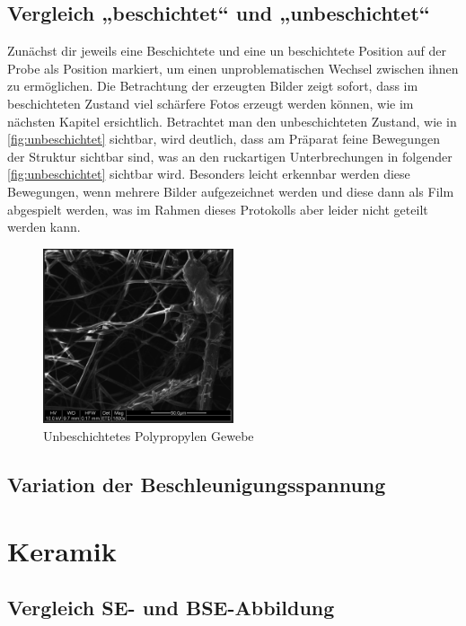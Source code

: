 \documentclass[12pt,english,ngerman]{scrartcl}
\begin{document}
\subsection{Vergleich „beschichtet“ und „unbeschichtet“}

Zunächst dir jeweils eine Beschichtete und eine un beschichtete Position auf der Probe als Position markiert, um einen
unproblematischen Wechsel zwischen ihnen zu ermöglichen. Die Betrachtung der erzeugten Bilder zeigt sofort, dass im 
beschichteten Zustand viel schärfere Fotos erzeugt werden können, wie im nächsten Kapitel ersichtlich. Betrachtet man 
den unbeschichteten Zustand, wie in \autoref{fig:unbeschichtet} sichtbar, wird deutlich, dass am Präparat feine 
Bewegungen der Struktur sichtbar sind, was an den ruckartigen Unterbrechungen in folgender \autoref{fig:unbeschichtet}
sichtbar wird. Besonders leicht erkennbar werden diese Bewegungen, wenn mehrere Bilder aufgezeichnet werden und diese 
dann als Film abgespielt werden, was im Rahmen dieses Protokolls aber leider nicht geteilt werden kann.
\begin{figure}[H]
	\begin{center}
		\includegraphics[width =0.5\textwidth]{./figures/unbedampft.png}
	\end{center}
	\caption{Unbeschichtetes Polypropylen Gewebe}
    \label{fig:unbeschichtet}
\end{figure}

\subsection{Variation der Beschleunigungsspannung}


\section{Keramik}


\subsection{Vergleich SE- und BSE-Abbildung}
\end{document}
